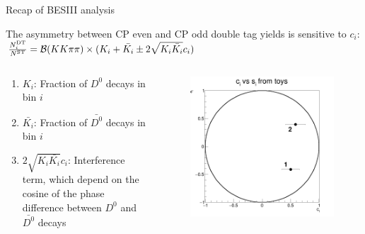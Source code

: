 \documentclass{beamer}
\begin{document}
\begin{frame}{Recap of BESIII analysis}
  \begin{center}
    The asymmetry between CP even and CP odd double tag yields is sensitive to $c_i$:\\
    $\frac{N^{\rm DT}_i}{N^{\rm ST}} = \mathcal{B}(KK\pi\pi)\times(K_i + \bar{K_i} \pm 2\sqrt{K_i\bar{K_i}}c_i)$
  \end{center}
  \begin{columns}[onlytextwidth]
    \begin{column}{0.6\textwidth}
      \centering
      \begin{enumerate}
        \setlength\itemsep{1.0em}
        \item{$K_i$: Fraction of $D^0$ decays in bin $i$}
        \item{$\bar{K_i}$: Fraction of $\bar{D^0}$ decays in bin $i$}
        \item{$2\sqrt{K_i\bar{K_i}}c_i$: Interference term, which depend on the cosine of the phase difference between $D^0$ and $\bar{D^0}$ decays}
      \end{enumerate}
    \end{column}
    \begin{column}{0.4\textwidth}
      \begin{figure}
        \includegraphics[width = 1.0\textwidth]{Plots/cisi_toys.png}
      \end{figure}
    \end{column}
  \end{columns}
\end{frame}
\end{document}
